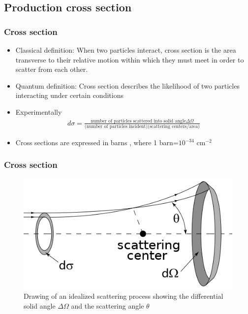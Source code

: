 \documentclass[11pt]{beamer}
\begin{document}
\begin{frame}
\section{Production cross section}
\frametitle{Cross section}
\begin{itemize}
\item Classical definition: When two particles interact, cross section is the area transverse to their relative motion within
which they must meet in order to scatter from each other.
\item Quantum definition: Cross section describes the likelihood of two particles interacting under certain conditions\cite{1}\cite{6}
\item Experimentally
\begin{align}
d\sigma=\frac{\text{number of particles scattered into solid angle} \Delta\Omega}{\text{(number of particles incident)(scattering centers/area)}}
\end{align}
\item Cross sections are expressed in barns , where 1 barn=$10^{-34}$ cm$^{-2}$ 
\end{itemize}
\end{frame}

\begin{frame}
\frametitle{Cross section}
\begin{center}\begin{center}
		
	\end{center}
	\begin{figure}
		\includegraphics[scale=0.5]{figures/cs1.png}
		\caption{Drawing of an idealized scattering process showing the differential solid angle $\Delta\Omega$ and the
			scattering angle $\theta$}
	\end{figure}
\end{center}
\end{frame}
\end{document}
